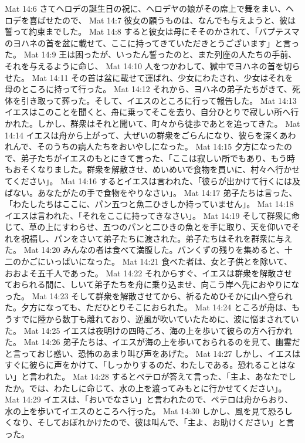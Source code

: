 Mat 14:6  さてヘロデの誕生日の祝に、ヘロデヤの娘がその席上で舞をまい、ヘロデを喜ばせたので、
Mat 14:7  彼女の願うものは、なんでも与えようと、彼は誓って約束までした。
Mat 14:8  すると彼女は母にそそのかされて、「バプテスマのヨハネの首を盆に載せて、ここに持ってきていただきとうございます」と言った。
Mat 14:9  王は困ったが、いったん誓ったのと、また列座の人たちの手前、それを与えるように命じ、
Mat 14:10  人をつかわして、獄中でヨハネの首を切らせた。
Mat 14:11  その首は盆に載せて運ばれ、少女にわたされ、少女はそれを母のところに持って行った。
Mat 14:12  それから、ヨハネの弟子たちがきて、死体を引き取って葬った。そして、イエスのところに行って報告した。
Mat 14:13  イエスはこのことを聞くと、舟に乗ってそこを去り、自分ひとりで寂しい所へ行かれた。しかし、群衆はそれと聞いて、町々から徒歩であとを追ってきた。
Mat 14:14  イエスは舟から上がって、大ぜいの群衆をごらんになり、彼らを深くあわれんで、そのうちの病人たちをおいやしになった。
Mat 14:15  夕方になったので、弟子たちがイエスのもとにきて言った、「ここは寂しい所でもあり、もう時もおそくなりました。群衆を解散させ、めいめいで食物を買いに、村々へ行かせてください」。
Mat 14:16  するとイエスは言われた、「彼らが出かけて行くには及ばない。あなたがたの手で食物をやりなさい」。
Mat 14:17  弟子たちは言った、「わたしたちはここに、パン五つと魚二ひきしか持っていません」。
Mat 14:18  イエスは言われた、「それをここに持ってきなさい」。
Mat 14:19  そして群衆に命じて、草の上にすわらせ、五つのパンと二ひきの魚とを手に取り、天を仰いでそれを祝福し、パンをさいて弟子たちに渡された。弟子たちはそれを群衆に与えた。
Mat 14:20  みんなの者は食べて満腹した。パンくずの残りを集めると、十二のかごにいっぱいになった。
Mat 14:21  食べた者は、女と子供とを除いて、おおよそ五千人であった。
Mat 14:22  それからすぐ、イエスは群衆を解散させておられる間に、しいて弟子たちを舟に乗り込ませ、向こう岸へ先におやりになった。
Mat 14:23  そして群衆を解散させてから、祈るためひそかに山へ登られた。夕方になっても、ただひとりそこにおられた。
Mat 14:24  ところが舟は、もうすでに陸から数丁も離れており、逆風が吹いていたために、波に悩まされていた。
Mat 14:25  イエスは夜明けの四時ごろ、海の上を歩いて彼らの方へ行かれた。
Mat 14:26  弟子たちは、イエスが海の上を歩いておられるのを見て、幽霊だと言っておじ惑い、恐怖のあまり叫び声をあげた。
Mat 14:27  しかし、イエスはすぐに彼らに声をかけて、「しっかりするのだ、わたしである。恐れることはない」と言われた。
Mat 14:28  するとペテロが答えて言った、「主よ、あなたでしたか。では、わたしに命じて、水の上を渡ってみもとに行かせてください」。
Mat 14:29  イエスは、「おいでなさい」と言われたので、ペテロは舟からおり、水の上を歩いてイエスのところへ行った。
Mat 14:30  しかし、風を見て恐ろしくなり、そしておぼれかけたので、彼は叫んで、「主よ、お助けください」と言った。
